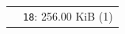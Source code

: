 \scriptsize
\setlength{\tabcolsep}{2pt}
\renewcommand{\arraystretch}{1.05}
\begin{tabular}{@{}l l@{}}
\definecolor{c255_215_0}{RGB}{255,215,0}
\colorbox{c255_215_0}{\phantom{Xg}} & \texttt{18}: 256.00 KiB (1) \\
\end{tabular}